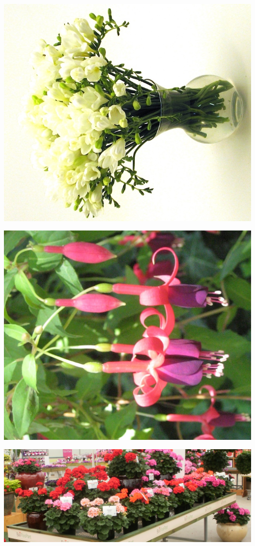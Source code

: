 \documentclass{article}
\begin{document}
\begin{center}
\includegraphics[height=0.925\paperheight]{../Freesia_white.jpg}
\end{center}
\newpage

\begin{center}
\includegraphics[height=0.925\paperheight]{../Fuchsia.jpg}
\end{center}
\newpage

\begin{center}
\includegraphics[height=0.925\paperheight]{../Geranium.jpg}
\end{center}
\newpage
\end{document}
